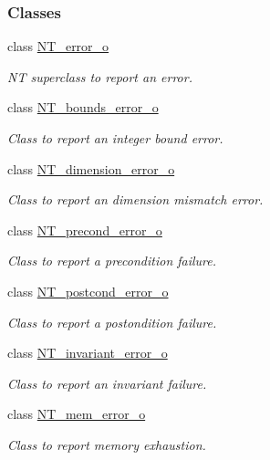 \subsubsection*{Classes}
\begin{DoxyCompactItemize}
\item 
class \hyperlink{class_n_t__error__o}{NT\_\-error\_\-o}
\begin{DoxyCompactList}\small\item\em NT superclass to report an error. \item\end{DoxyCompactList}\item 
class \hyperlink{class_n_t__bounds__error__o}{NT\_\-bounds\_\-error\_\-o}
\begin{DoxyCompactList}\small\item\em Class to report an integer bound error. \item\end{DoxyCompactList}\item 
class \hyperlink{class_n_t__dimension__error__o}{NT\_\-dimension\_\-error\_\-o}
\begin{DoxyCompactList}\small\item\em Class to report an dimension mismatch error. \item\end{DoxyCompactList}\item 
class \hyperlink{class_n_t__precond__error__o}{NT\_\-precond\_\-error\_\-o}
\begin{DoxyCompactList}\small\item\em Class to report a precondition failure. \item\end{DoxyCompactList}\item 
class \hyperlink{class_n_t__postcond__error__o}{NT\_\-postcond\_\-error\_\-o}
\begin{DoxyCompactList}\small\item\em Class to report a postondition failure. \item\end{DoxyCompactList}\item 
class \hyperlink{class_n_t__invariant__error__o}{NT\_\-invariant\_\-error\_\-o}
\begin{DoxyCompactList}\small\item\em Class to report an invariant failure. \item\end{DoxyCompactList}\item 
class \hyperlink{class_n_t__mem__error__o}{NT\_\-mem\_\-error\_\-o}
\begin{DoxyCompactList}\small\item\em Class to report memory exhaustion. \item\end{DoxyCompactList}\end{DoxyCompactItemize}
